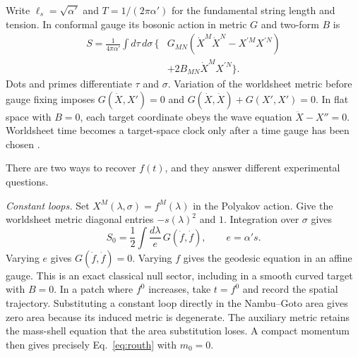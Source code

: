 \documentclass[10pt]{article}
\begin{document}
Write $\ell_s=\sqrt{\alpha'}$ and $T=1/(2\pi\alpha')$ for the fundamental string length and tension. In conformal gauge its bosonic action in metric $G$ and two-form $B$ is
\begin{equation}
\begin{aligned}
 S=\frac{1}{4\pi\alpha'}\int d\tau\,d\sigma\,\big\{&
 G_{MN}(\dot X^M\dot X^N-X^{\prime M}X^{\prime N})\\
 &+2B_{MN}\dot X^M X^{\prime N}\big\}.
\end{aligned}
 \label{eq:polyakov}
\end{equation}
Dots and primes differentiate $\tau$ and $\sigma$. Variation of the worldsheet metric before gauge fixing imposes $G(\dot X,X')=0$ and $G(\dot X,\dot X)+G(X',X')=0$. In flat space with $B=0$, each target coordinate obeys the wave equation $\ddot X-X''=0$. Worldsheet time becomes a target-space clock only after a time gauge has been chosen \cite{Polyakov1981Worldsheet,Tong2009String}.

There are two ways to recover $f(t)$, and they answer different experimental questions.

\emph{Constant loops.} Set $X^M(\lambda,\sigma)=f^M(\lambda)$ in the Polyakov action. Give the worldsheet metric diagonal entries $-s(\lambda)^2$ and $1$. Integration over $\sigma$ gives
\begin{equation}
 S_0=\frac12\int \frac{d\lambda}{e}\,G(\dot f,\dot f),
 \qquad e=\alpha's .
\end{equation} Varying $e$ gives $G(\dot f,\dot f)=0$. Varying $f$ gives the geodesic equation in an affine gauge. This is an exact classical null sector, including in a smooth curved target with $B=0$. In a patch where $f^0$ increases, take $t=f^0$ and record the spatial trajectory. Substituting a constant loop directly in the Nambu--Goto area gives zero area because its induced metric is degenerate. The auxiliary metric retains the mass-shell equation that the area substitution loses. A compact momentum then gives precisely Eq.~\eqref{eq:routh} with $m_0=0$.
\end{document}
